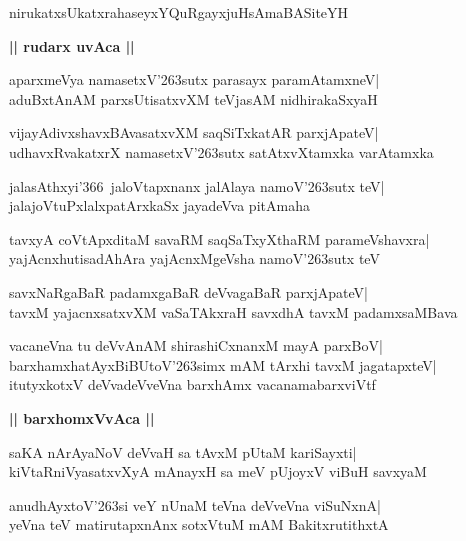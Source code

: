 \documentclass[twoside,12pt,openright]{book}
\def\S{\char'263}
\newcounter{shloka}[chapter]
\def\uvaca#1{\centerline{{\large\textbf{#1}}}}
\begin{document}
\begin{shloka}%
nirukatxsUkatxrahaseyxYQuRgayxjuHsAmaBASiteYH
\end{shloka}

\uvaca{|| rudarx uvAca ||}
\begin{shloka}%
aparxmeVya namasetxV\S sutx parasayx paramAtamxneV|\\
aduBxtAnAM parxsUtisatxvXM teVjasAM nidhirakaSxyaH
\end{shloka}

\begin{shloka}%
vijayAdivxshavxBAvasatxvXM saqSiTxkatAR parxjApateV|\\
udhavxRvakatxrX namasetxV\S sutx satAtxvXtamxka varAtamxka
\end{shloka}

\begin{shloka}%
jalasAthxyi\char'366\ jaloVtapxnanx jalAlaya namoV\S sutx teV|\\
jalajoVtuPxlalxpatArxkaSx jayadeVva pitAmaha
\end{shloka}

\begin{shloka}%
tavxyA coVtApxditaM savaRM saqSaTxyXthaRM parameVshavxra|\\
yajAcnxhutisadAhAra yajAcnxMgeVsha namoV\S sutx teV
\end{shloka}

\begin{shloka}%
savxNaRgaBaR padamxgaBaR deVvagaBaR parxjApateV|\\
tavxM yajacnxsatxvXM vaSaTAkxraH savxdhA tavxM padamxsaMBava
\end{shloka}

\begin{shloka}%
vacaneVna tu deVvAnAM shirashiCxnanxM mayA parxBoV|\\
barxhamxhatAyxBiBUtoV\S simx mAM tArxhi tavxM jagatapxteV|\\
itutyxkotxV deVvadeVveVna barxhAmx vacanamabarxviVtf
\end{shloka}

\uvaca{|| barxhomxVvAca ||}
\begin{shloka}%
saKA nArAyaNoV deVvaH sa tAvxM pUtaM kariSayxti|\\
kiVtaRniVyasatxvXyA mAnayxH sa meV pUjoyxV viBuH savxyaM
\end{shloka}

\begin{shloka}%
anudhAyxtoV\S si veY nUnaM teVna deVveVna viSuNxnA|\\
yeVna teV matirutapxnAnx sotxVtuM mAM BakitxrutithxtA
\end{shloka}
\end{document}
